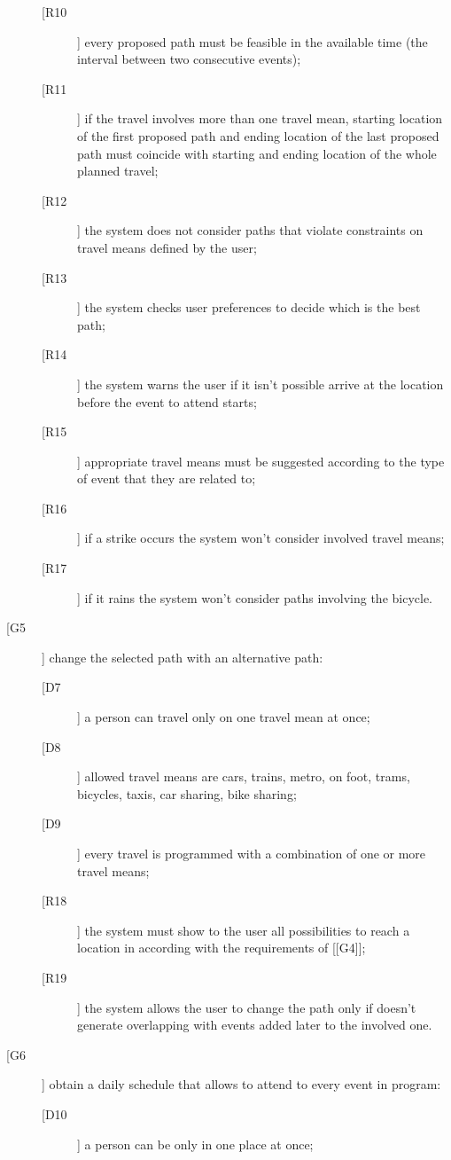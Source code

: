 \begin{description}
\begin{description}
	\newline
	\item[[R10]] every proposed path must be feasible in the available time (the interval between two consecutive events);
	\item[[R11]] if the travel involves more than one travel mean, starting location of the first proposed path and ending location of the last proposed path must coincide with starting and ending location of the whole planned travel;
	\item[[R12]] the system does not consider paths that violate constraints on travel means defined by the user;
	\item[[R13]] the system checks user preferences to decide which is the best path;
	\item[[R14]] the system warns the user if it isn’t possible arrive at the location before the event to attend starts;
	\item[[R15]] appropriate travel means must be suggested according to the type of event that they are related to; 
	\item[[R16]] if a strike occurs the system won’t consider involved travel means;
	\item[[R17]] if it rains the system won’t consider paths involving the bicycle.
	\end{description}
\item[[G5]] change the selected path with an alternative path:
	\begin{description}
	\item[[D7]] a person can travel only on one travel mean at once; 
	\item[[D8]] allowed travel means are cars, trains, metro, on foot, trams, bicycles, taxis, car sharing, bike sharing;
	\item[[D9]] every travel is programmed with a combination of one or more travel means;
	\newline
	\item[[R18]] the system must show to the user all possibilities to reach a location in according with the requirements of [[G4]];
	\item[[R19]] the system allows the user to change the path only if doesn’t generate overlapping with events added later to the involved one.
	\end{description}
\item[[G6]] obtain a daily schedule that allows to attend to every event in program:
	\begin{description}
	\item[[D10]] a person can be only in one place at once;

\end{description}
\end{description}
